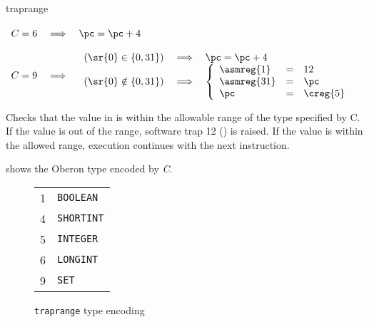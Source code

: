 \begin{instruction}{traprange}
{\begin{math}
\begin{array}{lcl}
           & & \\

           C = 6 & \implies & \pc = \pc + 4 \\

           & & \\

           C = 9 & \implies &
           \begin{array}{lcl}
             (\sr{0} \in \lbrace 0, 31 \rbrace) & \implies & \pc = \pc + 4 \\
             (\sr{0} \notin \lbrace 0, 31 \rbrace) & \implies &
             \left\lbrace
             \begin{array}{lcl}
               \asmreg{1} & = & 12 \\
               \asmreg{31} & = & \pc \\
               \pc & = & \creg{5} \\
             \end{array}
             \right. \\
           \end{array} \\

         \end{array}
       \end{math}
     }
     {
       Checks that the value in  is within the allowable range
       of the type specified by \textrm{C}.  If the value is out of
       the range, software trap 12 () is raised.  If
       the value is within the allowed range, execution continues with
       the next instruction.

        shows the Oberon type encoded by
       \emph{C}.

       \begin{figure}[H]
         \centering
           \begin{tabular}{l|l}
             1 & \texttt{BOOLEAN} \\
             4 & \texttt{SHORTINT} \\
             5 & \texttt{INTEGER} \\
             6 & \texttt{LONGINT} \\
             9 & \texttt{SET} \\
           \end{tabular}
         \caption{\texttt{traprange} type encoding}\label{fig:traprange-type}
       \end{figure}
     }
\end{instruction}

